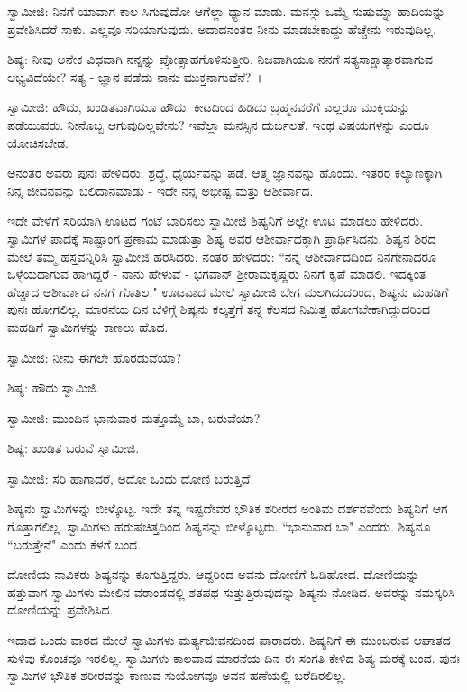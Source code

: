 ಸ್ವಾಮೀಜಿ: ನಿನಗೆ ಯಾವಾಗ ಕಾಲ ಸಿಗುವುದೋ ಆಗೆಲ್ಲಾ ಧ್ಯಾನ ಮಾಡು. ಮನಸ್ಸು ಒಮ್ಮೆ ಸುಷುಮ್ನಾ ಹಾದಿಯನ್ನು ಪ್ರವೇಶಿಸಿದರೆ ಸಾಕು. ಎಲ್ಲವೂ ಸರಿಯಾಗುವುದು. ಅದಾದನಂತರ ನೀನು ಮಾಡಬೇಕಾದ್ದು ಹೆಚ್ಚೇನು ಇರುವುದಿಲ್ಲ.

ಶಿಷ್ಯ: ನೀವು ಅನೇಕ ವಿಧವಾಗಿ ನನ್ನನ್ನು ಪ್ರೋತ್ಸಾಹಗೊಳಿಸುತ್ತೀರಿ. ನಿಜವಾಗಿಯೂ ನನಗೆ ಸತ್ಯಸಾಕ್ಷಾತ್ಕಾರವಾಗುವ ಲಭ್ಯವಿದೆಯೇ? ಸತ್ಯ - ಜ್ಞಾನ ಪಡೆದು ನಾನು ಮುಕ್ತನಾಗುವೆನೆ?~।

ಸ್ವಾಮೀಜಿ: ಹೌದು, ಖಂಡಿತವಾಗಿಯೂ ಹೌದು. ಕೀಟದಿಂದ ಹಿಡಿದು ಬ್ರಹ್ಮನವರೆಗೆ ಎಲ್ಲರೂ ಮುಕ್ತಿಯನ್ನು ಪಡೆಯುವರು. ನೀನೊಬ್ಬ ಆಗುವುದಿಲ್ಲವೇನು? ಇವೆಲ್ಲಾ ಮನಸ್ಸಿನ ದುರ್ಬಲತೆ. ಇಂಥ ವಿಷಯಗಳನ್ನು ಎಂದೂ ಯೋಚಿಸಬೇಡ.

ಅನಂತರ ಅವರು ಪುನಃ ಹೇಳಿದರು: ಶ್ರದ್ಧೆ, ಧೈರ್ಯವನ್ನು ಪಡೆ. ಆತ್ಮ ಜ್ಞಾನವನ್ನು ಹೊಂದು. ಇತರರ ಕಲ್ಯಾಣಕ್ಕಾಗಿ ನಿನ್ನ ಜೀವನವನ್ನು ಬಲಿದಾನಮಾಡು - ಇದೇ ನನ್ನ ಅಭೀಷ್ಟ ಮತ್ತು ಆಶೀರ್ವಾದ.

ಇದೇ ವೇಳೆಗೆ ಸರಿಯಾಗಿ ಊಟದ ಗಂಟೆ ಬಾರಿಸಲು ಸ್ವಾಮೀಜಿ ಶಿಷ್ಯನಿಗೆ ಅಲ್ಲೇ ಊಟ ಮಾಡಲು ಹೇಳಿದರು. ಸ್ವಾಮಿಗಳ ಪಾದಕ್ಕೆ ಸಾಷ್ಟಾಂಗ ಪ್ರಣಾಮ ಮಾಡುತ್ತಾ ಶಿಷ್ಯ ಅವರ ಆಶೀರ್ವಾದಕ್ಕಾಗಿ ಪ್ರಾರ್ಥಿಸಿದನು. ಶಿಷ್ಯನ ಶಿರದ ಮೇಲೆ ತಮ್ಮ ಹಸ್ತವನ್ನಿರಿಸಿ ಸ್ವಾಮೀಜಿ ಹರಸಿದರು. ನಂತರ ಹೇಳಿದರು: “ನನ್ನ ಆಶೀರ್ವಾದದಿಂದ ನಿನಗೇನಾದರೂ ಒಳ್ಳೆಯದಾಗುವ ಹಾಗಿದ್ದರೆ - ನಾನು ಹೇಳುವೆ - ಭಗವಾನ್ ಶ‍್ರೀರಾಮಕೃಷ್ಣರು ನಿನಗೆ ಕೃಪೆ ಮಾಡಲಿ. ಇದಕ್ಕಿಂತ ಹೆಚ್ಚಾದ ಆಶೀರ್ವಾದ ನನಗೆ ಗೊತಿಲ." ಊಟವಾದ ಮೇಲೆ ಸ್ವಾಮೀಜಿ ಬೇಗ ಮಲಗಿದುದರಿಂದ, ಶಿಷ್ಯನು ಮಹಡಿಗೆ ಪುನಃ ಹೋಗಲಿಲ್ಲ. ಮಾರನೆಯ ದಿನ ಬೆಳಿಗ್ಗೆ ಶಿಷ್ಯನು ಕಲ್ಕತ್ತೆಗೆ ತನ್ನ ಕೆಲಸದ ನಿಮಿತ್ತ ಹೋಗಬೇಕಾಗಿದ್ದುದರಿಂದ ಮಹಡಿಗೆ ಸ್ವಾಮಿಗಳನ್ನು ಕಾಣಲು ಹೊದ.

ಸ್ವಾಮೀಜಿ: ನೀನು ಈಗಲೇ ಹೊರಡುವೆಯಾ?

ಶಿಷ್ಯ: ಹೌದು ಸ್ವಾಮಿಜಿ.

ಸ್ವಾಮೀಜಿ: ಮುಂದಿನ ಭಾನುವಾರ ಮತ್ತೊಮ್ಮೆ ಬಾ, ಬರುವೆಯಾ?

ಶಿಷ್ಯ: ಖಂಡಿತ ಬರುವೆ ಸ್ವಾಮೀಜಿ.

ಸ್ವಾಮೀಜಿ: ಸರಿ ಹಾಗಾದರೆ, ಅದೋ ಒಂದು ದೋಣಿ ಬರುತ್ತಿದೆ.

ಶಿಷ್ಯನು ಸ್ವಾಮಿಗಳನ್ನು ಬೀಳ್ಕೊಟ್ಟ. ಇದೇ ತನ್ನ ಇಷ್ಟದೇವರ ಭೌತಿಕ ಶರೀರದ ಅಂತಿಮ ದರ್ಶನವೆಂದು ಶಿಷ್ಯನಿಗೆ ಆಗ ಗೊತ್ತಾಗಲಿಲ್ಲ. ಸ್ವಾಮಿಗಳು ಹರುಷಚಿತ್ತದಿಂದ ಶಿಷ್ಯನನ್ನು ಬೀಳ್ಕೊಟ್ಟರು. “ಭಾನುವಾರ ಬಾ" ಎಂದರು. ಶಿಷ್ಯನೂ “ಬರುತ್ತೇನೆ" ಎಂದು ಕೆಳಗೆ ಬಂದ.

ದೋಣಿಯ ನಾವಿಕರು ಶಿಷ್ಯನನ್ನು ಕೂಗುತ್ತಿದ್ದರು. ಆದ್ದರಿಂದ ಅವನು ದೋಣಿಗೆ ಓಡಿಹೋದ. ದೋಣಿಯನ್ನು ಹತ್ತುವಾಗ ಸ್ವಾಮಿಗಳು ಮೇಲಿನ ವರಾಂಡದಲ್ಲಿ ಶತಪಥ ಸುತ್ತುತ್ತಿರುವುದನ್ನು ಶಿಷ್ಯನು ನೋಡಿದ. ಅವರನ್ನು ನಮಸ್ಕರಿಸಿ ದೋಣಿಯನ್ನು ಪ್ರವೇಶಿಸಿದ.

ಇದಾದ ಒಂದು ವಾರದ ಮೇಲೆ ಸ್ವಾಮಿಗಳು ಮರ್ತ್ಯಜೀವನದಿಂದ ಪಾರಾದರು. ಶಿಷ್ಯನಿಗೆ ಈ ಮುಂಬರುವ ಆಘಾತದ ಸುಳಿವು ಕೊಂಚವೂ ಇರಲಿಲ್ಲ. ಸ್ವಾಮಿಗಳು ಕಾಲವಾದ ಮಾರನೆಯ ದಿನ ಈ ಸಂಗತಿ ಕೇಳಿದ ಶಿಷ್ಯ ಮಠಕ್ಕೆ ಬಂದ. ಪುನಃ ಸ್ವಾಮಿಗಳ ಭೌತಿಕ ಶರೀರವನ್ನು ಕಾಣುವ ಸುಯೋಗವೂ ಅವನ ಹಣೆಯಲ್ಲಿ ಬರೆದಿರಲಿಲ್ಲ.

